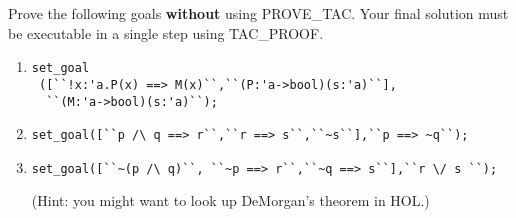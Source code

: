 \begin{exercise}
  Prove the following goals \textbf{without} using PROVE\_TAC.  Your
  final solution must be executable in a single step using TAC\_PROOF.
  \begin{enumerate}
  \item
\begin{verbatim}
set_goal
 ([``!x:'a.P(x) ==> M(x)``,``(P:'a->bool)(s:'a)``],
  ``(M:'a->bool)(s:'a)``);
\end{verbatim}
  \item
\begin{verbatim}
set_goal([``p /\ q ==> r``,``r ==> s``,``~s``],``p ==> ~q``);
\end{verbatim}
  \item
\begin{verbatim}
set_goal([``~(p /\ q)``, ``~p ==> r``,``~q ==> s``],``r \/ s ``);
\end{verbatim}
    (Hint: you might want to look up DeMorgan's theorem in HOL.)

  \end{enumerate}
\end{exercise}

